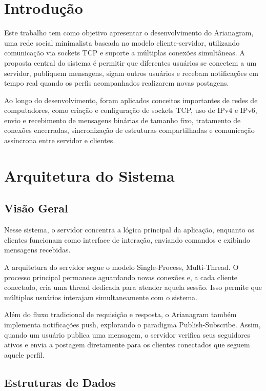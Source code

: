 \section{Introdução}

Este trabalho tem como objetivo apresentar o desenvolvimento do Arianagram, uma rede social minimalista baseada no modelo cliente-servidor, utilizando comunicação via sockets TCP e suporte a múltiplas conexões simultâneas. A proposta central do sistema é permitir que diferentes usuários se conectem a um servidor, publiquem mensagens, sigam outros usuários e recebam notificações em tempo real quando os perfis acompanhados realizarem novas postagens.

Ao longo do desenvolvimento, foram aplicados conceitos importantes de redes de computadores, como criação e configuração de sockets TCP, uso de IPv4 e IPv6, envio e recebimento de mensagens binárias de tamanho fixo, tratamento de conexões encerradas, sincronização de estruturas compartilhadas e comunicação assíncrona entre servidor e clientes.

\section{Arquitetura do Sistema}

\subsection{Visão Geral}

Nesse sistema, o servidor concentra a lógica principal da aplicação, enquanto os clientes funcionam como interface de interação, enviando comandos e exibindo mensagens recebidas.

A arquitetura do servidor segue o modelo Single-Process, Multi-Thread. O processo principal permanece aguardando novas conexões e, a cada cliente conectado, cria uma thread dedicada para atender aquela sessão. Isso permite que múltiplos usuários interajam simultaneamente com o sistema.

Além do fluxo tradicional de requisição e resposta, o Arianagram também implementa notificações push, explorando o paradigma Publish-Subscribe. Assim, quando um usuário publica uma mensagem, o servidor verifica seus seguidores ativos e envia a postagem diretamente para os clientes conectados que seguem aquele perfil.

\subsection{Estruturas de Dados}

